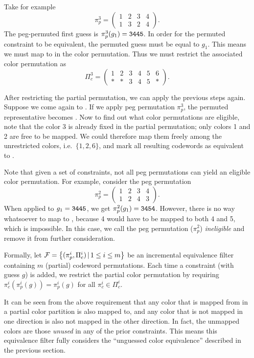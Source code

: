 Take for example 
\[
\pi_p^3 = 
\begin{pmatrix}
1 & 2 & 3 & 4 \\
1 & 3 & 2 & 4
\end{pmatrix} .
\] 
The peg-permuted first guess is $\pi_p^3(g_1) = \texttt{3445}$. In order for the permuted constraint to be equivalent, the permuted guess must be equal to $g_1$. This means we must map  to  in the color permutation. Thus we must restrict the associated color permutation as
\[
\Pi_c^3 = 
\begin{pmatrix}
1 & 2 & 3 & 4 & 5 & 6 \\
* & * & 3 & 4 & 5 & * 
\end{pmatrix} .
\]

After restricting the partial permutation, we can apply the previous steps again. Suppose we come again to . If we apply peg permutation $\pi_p^3$, the permuted representative becomes . Now to find out what color permutations are eligible, note that the color 3 is already fixed in the partial permutation; only colors 1 and 2 are free to be mapped. We could therefore map them freely among the unrestricted colors, i.e.\ $\{1, 2, 6\}$, and mark all resulting codewords as equivalent to .

Note that given a set of constraints, not all peg permutations can yield an eligible color permutation. For example, consider the peg permutation
\[
\pi_p^2 = 
\begin{pmatrix}
1 & 2 & 3 & 4 \\
1 & 2 & 4 & 3
\end{pmatrix} .
\]
When applied to $g_1 = \texttt{3445}$, we get $\pi_p^2(g_1) = \texttt{3454}$. However, there is no way whatsoever to map  to , because 4 would have to be mapped to both 4 and 5, which is impossible. In this case, we call the peg permutation ($\pi_p^2$) \emph{ineligible} and remove it from further consideration.

Formally, let $\mathcal{F} = \left\{(\pi_p^i, \Pi_c^i) \,|\, 1 \le i \le m \right\}$ be an incremental equivalence filter containing $m$ (partial) codeword permutations. Each time a constraint (with guess $g$) is added, we restrict the partial color permutation by requiring $\pi_c^i ( \pi_p^i (g) ) = \pi_p^i (g)$ for all $\pi_c^i \in \Pi_c^i$. 

It can be seen from the above requirement that any color that is mapped from in a partial color partition is also mapped to, and any color that is not mapped in one direction is also not mapped in the other direction. In fact, the unmapped colors are those \emph{unused} in any of the prior constraints. This means this equivalence filter fully considers the ``unguessed color equivalence'' described in the previous section.

